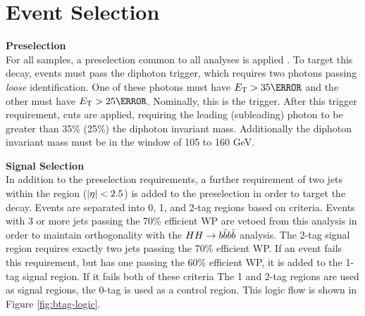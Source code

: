 \section{Event Selection} \label{sec:yybb-event-selection}
\noindent\textbf{Preselection}\\
\indent For all samples, a preselection common to all \Hgg analyses is applied \cite{hgam-preselection}. To target this decay, events must pass the diphoton trigger, which requires two photons passing \textit{loose} identification. One of these photons must have $\et > \unit{35}{\GeV}$ and the other must have $\et > \unit{25}{\GeV}$. Nominally, this is the  trigger. After this trigger requirement, \pt cuts are applied, requiring the leading (subleading) photon \pt to be greater than 35\% (25\%) the diphoton invariant mass. Additionally the diphoton invariant mass must be in the window of 105 to 160 GeV.

\noindent\textbf{Signal Selection}\\
\indent In addition to the preselection requirements, a further requirement of two jets within the \btagging region ($|\eta| <2.5$) is added to the preselection in order to target the \Hbb decay. Events are separated into 0, 1, and 2-tag regions based on \btagging criteria. Events with 3 or more jets passing the 70\% efficient \btagging \gls{WP} are vetoed from this analysis in order to maintain orthogonality with the $HH \rightarrow b\bar{b} b\bar{b}$ analysis. The 2-tag signal region requires exactly two jets passing the 70\% efficient \btagging \gls{WP}. If an event fails this requirement, but has one \bjet passing the 60\% efficient \btagging \gls{WP}, it is added to the 1-tag signal region. If it fails both of these criteria The 1 and 2-tag regions are used as signal regions, the 0-tag is used as a control region. This logic flow is shown in Figure \ref{fig:btag-logic}.


